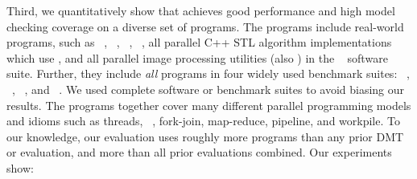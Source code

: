 Third, we quantitatively show that \xxx achieves good performance and high
model checking coverage on a diverse set of \nprog programs.  The programs
include \nrealprog real-world programs, such as \bdb~\cite{berkeleydb},
\openldap~\cite{openldap}, \redis~\cite{redis}, \mplayer~\cite{mplayer},
all \nstl parallel C++ STL algorithm 
implementations~\cite{parallel-stl} which use \openmp, and all \nimagick
parallel image processing utilities (also \openmp) in the \imagick~\cite{imagick}
software suite.  Further, they
include \emph{all} \nbenchmarks programs in four widely used benchmark suites:
\parsec~\cite{parsec}, \phoenix~\cite{phoenix-benchmarks}, \splashx~\cite{splashx},
and \npb~\cite{npb}.  We used complete software or benchmark suites to
avoid biasing our results. The programs together cover many different
parallel programming models and idioms such as threads,
\openmp~\cite{openmp}, fork-join, map-reduce, pipeline, and workpile.  To
our knowledge, our
evaluation uses roughly \overeach more programs than any prior
DMT or \smt evaluation, and \overcombined more than all
prior evaluations combined.
Our experiments show:
